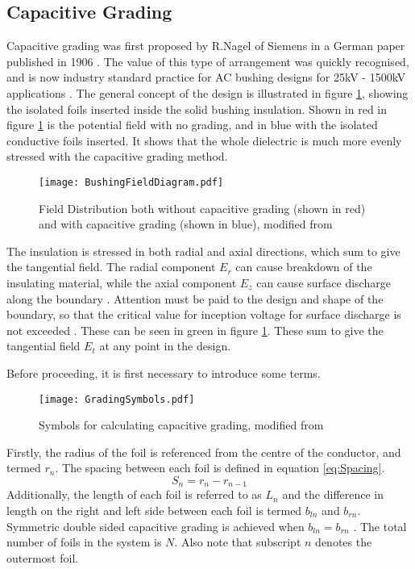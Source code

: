 \subsection{Capacitive Grading} \label{ss:CapacitiveGrading}
Capacitive grading was first proposed by R.Nagel of Siemens in a German paper published in 1906 \cite{harlow2004electric}.
The value of this type of arrangement was quickly recognised, and is now industry standard practice for AC bushing designs for 25kV - 1500kV applications \cite{james2008condition}.
The general concept of the design is illustrated in figure \ref{figure:fieldgeneric}, showing the isolated foils inserted inside the solid bushing insulation.
Shown in red in figure \ref{figure:fieldgeneric} is the potential field with no grading, and in blue with the isolated conductive foils inserted.
It shows that the whole dielectric is much more evenly stressed with the capacitive grading method.

\begin{figure}[!h]
   \centering
   \texttt{[image: BushingFieldDiagram.pdf]}
   \caption{Field Distribution both without capacitive grading (shown in red) and with capacitive grading (shown in blue), modified from \cite{james2008condition}}
   \label{figure:fieldgeneric}
\end{figure}

The insulation is stressed in both radial and axial directions, which sum to give the tangential field.
The radial component $E_r$ can cause breakdown of the insulating material, while the axial component $E_z$ can cause surface discharge along the boundary \cite{Ahmed11}.
Attention must be paid to the design and shape of the boundary, so that the critical value for inception voltage for surface discharge is not exceeded \cite{david2}.
These can be seen in green in figure \ref{figure:fieldgeneric}.
These sum to give the tangential field $E_t$ at any point in the design.

Before proceeding, it is first necessary to introduce some terms.
\begin{figure}[!h]
   \centering
   \texttt{[image: GradingSymbols.pdf]}
   \caption{Symbols for calculating capacitive grading, modified from \cite{Ahmed11}}
   \label{figure:terms}
\end{figure}
Firstly, the radius of the foil is referenced from the centre of the conductor, and termed $r_n$. 
The spacing between each foil is defined in equation \ref{eq:Spacing}.
\begin{equation}
   \label{eq:Spacing}
   S_n = r_n - r_{n-1}
\end{equation}
Additionally, the length of each foil is referred to as $L_n$ and the difference in length on the right and left side between each foil is termed $b_{ln}$ and $b_{rn}$. 
Symmetric double sided capacitive grading is achieved when $b_{ln}=b_{rn}$ \cite{Ahmed11}. 
The total number of foils in the system is $N$.
Also note that subscript $n$ denotes the outermost foil.

